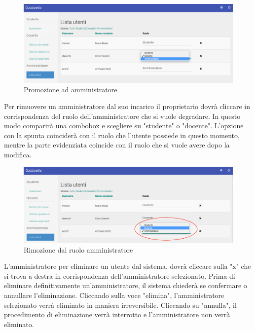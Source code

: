 \documentclass[12pt,a4paper]{article}
\begin{document}
		\begin{figure}[H]
			\centering
			\includegraphics[width=1\linewidth]{../img/screenshot/cambioRuoloDocAmm.png}
			\caption{Promozione ad amministratore}
			\label{Promozione ad amministratore}
		\end{figure}
	
	Per rimuovere un amministratore dal suo incarico il proprietario dovrà cliccare in corrispondenza del ruolo dell'amministratore che si vuole degradare. In questo modo comparirà una combobox e scegliere su "studente" o "docente". L'opzione con la spunta coinciderà con il ruolo che l'utente possiede in questo momento, mentre la parte evidenziata coincide con il ruolo che si vuole avere dopo la modifica.
	
		\begin{figure}[H]
			\centering
			\includegraphics[width=1\linewidth]{../img/screenshot/cambioRuoloAmmDoc.png}
			\caption{Rimozione dal ruolo amministratore}
			\label{Rimozione dal ruolo amministratore}
		\end{figure}
	
	L'amministratore per eliminare un utente dal sistema, dovrà cliccare sulla "x" che si trova a destra in corrispondenza dell'amministratore selezionato. Prima di eliminare definitivamente un'amministratore, il sistema chiederà se confermare o annullare l'eliminazione. Cliccando sulla voce "elimina", l'amministratore selezionato verrà eliminato in maniera irreversibile. Cliccando su "annulla", il procedimento di eliminazione verrà interrotto e l'amministratore non verrà eliminato.
	
\end{document}
